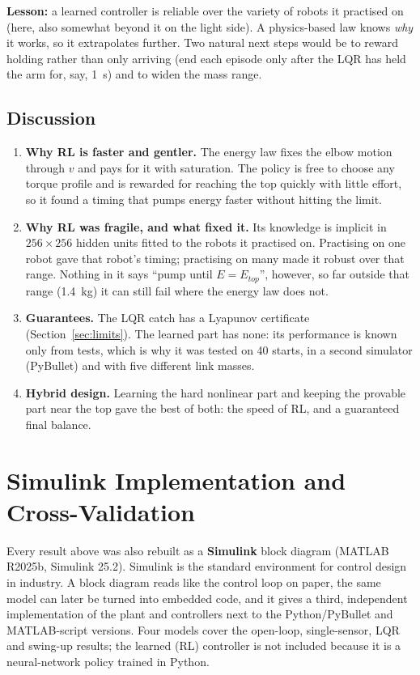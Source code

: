 \documentclass[12pt,a4paper]{article}
\begin{document}
\textbf{Lesson:} a learned controller is reliable over the variety of robots it practised on (here, also somewhat beyond it on the light side). A physics-based law knows \emph{why} it works, so it extrapolates further. Two natural next steps would be to reward holding rather than only arriving (end each episode only after the LQR has held the arm for, say, 1~s) and to widen the mass range.

\subsection{Discussion}
\begin{enumerate}
\item \textbf{Why RL is faster and gentler.} The energy law fixes the elbow motion through $v$ and pays for it with saturation. The policy is free to choose any torque profile and is rewarded for reaching the top quickly with little effort, so it found a timing that pumps energy faster without hitting the limit.
\item \textbf{Why RL was fragile, and what fixed it.} Its knowledge is implicit in $256\times256$ hidden units fitted to the robots it practised on. Practising on one robot gave that robot's timing; practising on many made it robust over that range. Nothing in it says ``pump until $E=E_{top}$'', however, so far outside that range (1.4~kg) it can still fail where the energy law does not.
\item \textbf{Guarantees.} The LQR catch has a Lyapunov certificate (Section~\ref{sec:limits}). The learned part has none: its performance is known only from tests, which is why it was tested on 40 starts, in a second simulator (PyBullet) and with five different link masses.
\item \textbf{Hybrid design.} Learning the hard nonlinear part and keeping the provable part near the top gave the best of both: the speed of RL, and a guaranteed final balance.
\end{enumerate}
\section{Simulink Implementation and Cross-Validation}\label{sec:simulink}
Every result above was also rebuilt as a \textbf{Simulink} block diagram (MATLAB R2025b, Simulink 25.2). Simulink is the standard environment for control design in industry. A block diagram reads like the control loop on paper, the same model can later be turned into embedded code, and it gives a third, independent implementation of the plant and controllers next to the Python/PyBullet and MATLAB-script versions. Four models cover the open-loop, single-sensor, LQR and swing-up results; the learned (RL) controller is not included because it is a neural-network policy trained in Python.
\end{document}
